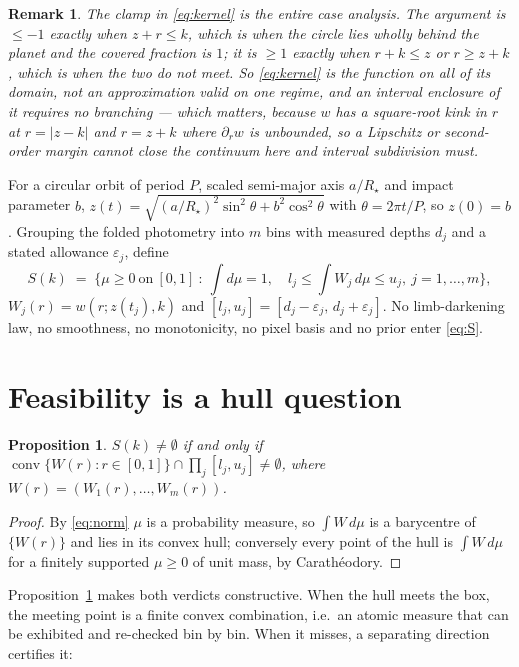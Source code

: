 \documentclass[11pt]{article}
\newtheorem{proposition}{Proposition}
\newtheorem*{remark}{Remark}
\begin{document}
\begin{remark}
The clamp in \eqref{eq:kernel} is the entire case analysis. The argument is
$\le -1$ exactly when $z+r\le k$, which is when the circle lies wholly behind the
planet and the covered fraction is $1$; it is $\ge 1$ exactly when $r+k\le z$ or
$r\ge z+k$, which is when the two do not meet. So \eqref{eq:kernel} \emph{is} the
function on all of its domain, not an approximation valid on one regime, and an
interval enclosure of it requires no branching --- which matters, because
$w$ has a square-root kink in $r$ at $r=|z-k|$ and $r=z+k$ where $\partial_r w$
is unbounded, so a Lipschitz or second-order margin cannot close the continuum
here and interval subdivision must.
\end{remark}

For a circular orbit of period $P$, scaled semi-major axis $a/R_\star$ and impact
parameter $b$, $z(t)=\sqrt{(a/R_\star)^2\sin^2\theta+b^2\cos^2\theta}$ with
$\theta=2\pi t/P$, so $z(0)=b$. Grouping the folded photometry into $m$ bins with
measured depths $d_j$ and a stated allowance $\varepsilon_j$, define
\begin{equation}
S(k)\;=\;\Big\{\mu\ge 0 \ \text{on}\ [0,1]\ :\ \int d\mu=1,\quad
l_j\le \int W_j\,d\mu \le u_j,\ j=1,\dots,m\Big\},
\label{eq:S}
\end{equation}
$W_j(r)=w(r;z(t_j),k)$ and $[l_j,u_j]=[d_j-\varepsilon_j,\,d_j+\varepsilon_j]$.
No limb-darkening law, no smoothness, no monotonicity, no pixel basis and no
prior enter \eqref{eq:S}.

\section{Feasibility is a hull question}

\begin{proposition}\label{prop:hull}
$S(k)\neq\emptyset$ if and only if
$\operatorname{conv}\{W(r):r\in[0,1]\}\cap\prod_j[l_j,u_j]\neq\emptyset$, where
$W(r)=(W_1(r),\dots,W_m(r))$.
\end{proposition}

\begin{proof}
By \eqref{eq:norm} $\mu$ is a probability measure, so $\int W\,d\mu$ is a
barycentre of $\{W(r)\}$ and lies in its convex hull; conversely every point of
the hull is $\int W\,d\mu$ for a finitely supported $\mu\ge0$ of unit mass, by
Carath\'eodory.
\end{proof}

Proposition~\ref{prop:hull} makes both verdicts constructive. When the hull meets
the box, the meeting point is a finite convex combination, i.e.\ an atomic
measure that can be exhibited and re-checked bin by bin. When it misses, a
separating direction certifies it:
\end{document}
